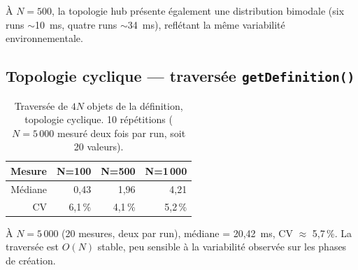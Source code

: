 À $N=500$, la topologie hub présente également une distribution
bimodale (six runs $\sim$10~ms, quatre runs $\sim$34~ms), reflétant
la même variabilité environnementale.

\subsection*{Topologie cyclique --- traversée \texttt{getDefinition()}}

\begin{table}[h]
\centering
\caption{Traversée de $4N$ objets de la définition, topologie cyclique.
10 répétitions ($N=5\,000$ mesuré deux fois par run, soit 20 valeurs).}
\begin{tabular}{rrrr}
\hline
\textbf{Mesure} & \textbf{N=100} & \textbf{N=500} & \textbf{N=1\,000} \\
\hline
Médiane & 0,43 & 1,96 & 4,21 \\
CV      & 6,1\,\% & 4,1\,\% & 5,2\,\% \\
\hline
\end{tabular}
\end{table}

À $N=5\,000$ (20 mesures, deux par run), médiane = 20,42~ms, CV $\approx$ 5,7\,\%.
La traversée est $O(N)$ stable, peu sensible à la variabilité observée
sur les phases de création.
